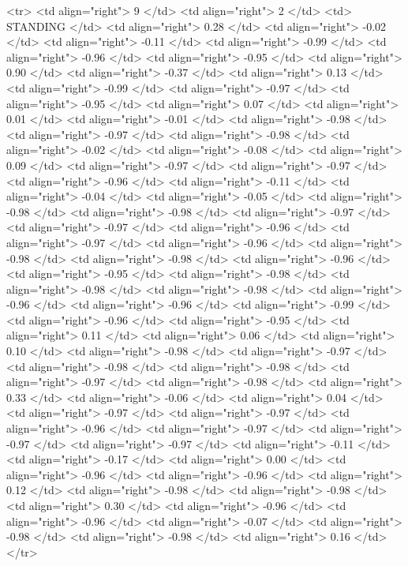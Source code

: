   <tr> <td align="right"> 9 </td> <td align="right">   2 </td> <td> STANDING </td> <td align="right"> 0.28 </td> <td align="right"> -0.02 </td> <td align="right"> -0.11 </td> <td align="right"> -0.99 </td> <td align="right"> -0.96 </td> <td align="right"> -0.95 </td> <td align="right"> 0.90 </td> <td align="right"> -0.37 </td> <td align="right"> 0.13 </td> <td align="right"> -0.99 </td> <td align="right"> -0.97 </td> <td align="right"> -0.95 </td> <td align="right"> 0.07 </td> <td align="right"> 0.01 </td> <td align="right"> -0.01 </td> <td align="right"> -0.98 </td> <td align="right"> -0.97 </td> <td align="right"> -0.98 </td> <td align="right"> -0.02 </td> <td align="right"> -0.08 </td> <td align="right"> 0.09 </td> <td align="right"> -0.97 </td> <td align="right"> -0.97 </td> <td align="right"> -0.96 </td> <td align="right"> -0.11 </td> <td align="right"> -0.04 </td> <td align="right"> -0.05 </td> <td align="right"> -0.98 </td> <td align="right"> -0.98 </td> <td align="right"> -0.97 </td> <td align="right"> -0.97 </td> <td align="right"> -0.96 </td> <td align="right"> -0.97 </td> <td align="right"> -0.96 </td> <td align="right"> -0.98 </td> <td align="right"> -0.98 </td> <td align="right"> -0.96 </td> <td align="right"> -0.95 </td> <td align="right"> -0.98 </td> <td align="right"> -0.98 </td> <td align="right"> -0.98 </td> <td align="right"> -0.96 </td> <td align="right"> -0.96 </td> <td align="right"> -0.99 </td> <td align="right"> -0.96 </td> <td align="right"> -0.95 </td> <td align="right"> 0.11 </td> <td align="right"> 0.06 </td> <td align="right"> 0.10 </td> <td align="right"> -0.98 </td> <td align="right"> -0.97 </td> <td align="right"> -0.98 </td> <td align="right"> -0.98 </td> <td align="right"> -0.97 </td> <td align="right"> -0.98 </td> <td align="right"> 0.33 </td> <td align="right"> -0.06 </td> <td align="right"> 0.04 </td> <td align="right"> -0.97 </td> <td align="right"> -0.97 </td> <td align="right"> -0.96 </td> <td align="right"> -0.97 </td> <td align="right"> -0.97 </td> <td align="right"> -0.97 </td> <td align="right"> -0.11 </td> <td align="right"> -0.17 </td> <td align="right"> 0.00 </td> <td align="right"> -0.96 </td> <td align="right"> -0.96 </td> <td align="right"> 0.12 </td> <td align="right"> -0.98 </td> <td align="right"> -0.98 </td> <td align="right"> 0.30 </td> <td align="right"> -0.96 </td> <td align="right"> -0.96 </td> <td align="right"> -0.07 </td> <td align="right"> -0.98 </td> <td align="right"> -0.98 </td> <td align="right"> 0.16 </td> </tr>
